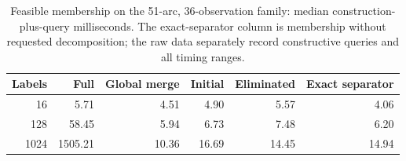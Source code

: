 \begin{table}[tb]\centering\small
\caption{Feasible membership on the 51-arc, 36-observation family: median construction-plus-query milliseconds. The exact-separator column is membership without requested decomposition; the raw data separately record constructive queries and all timing ranges.}
\label{tab:computation-member}
\begin{tabular}{rrrrrr}\toprule
Labels & Full & Global merge & Initial & Eliminated & Exact separator\\\midrule
16 & 5.71 & 4.51 & 4.90 & 5.57 & 4.06 \\
128 & 58.45 & 5.94 & 6.73 & 7.48 & 6.20 \\
1024 & 1505.21 & 10.36 & 16.69 & 14.45 & 14.94 \\
\bottomrule\end{tabular}\end{table}
